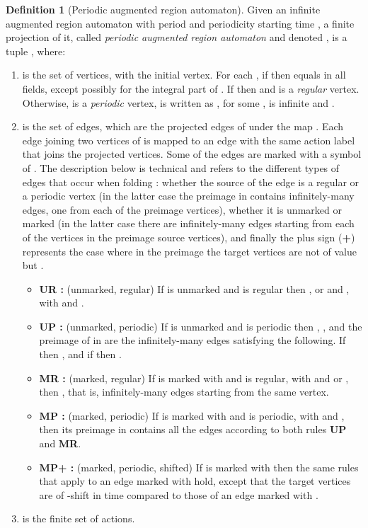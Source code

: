 \documentclass[11pt]{amsart}
\theoremstyle{definition}
\newtheorem{definition}[theorem]{Definition}
\begin{document}
\begin{definition}[Periodic augmented region automaton]
	\label{def:per_aug_region_automaton}
	Given an infinite augmented region automaton  with period  and periodicity starting time , a finite projection  of it, called \emph{periodic augmented region automaton} and denoted , is a tuple , where:
	\begin{enumerate}
		\item  is the set of vertices, with  the initial vertex.
		For each , if  then  equals  in all fields, except possibly for the integral part of .
If  then  and  is a \emph{regular} vertex.
		Otherwise,  is a \emph{periodic} vertex,  is written as , for some ,  is infinite and .
\item  is the set of edges, which are the projected edges of  under the map .
		Each edge joining two vertices of  is mapped to an edge with the same action label that joins the projected vertices. 
		Some of the edges are marked with a symbol of .
		The description below is technical and refers to the different types of edges that occur when folding : whether the source of the edge is a regular  or a periodic  vertex (in the latter case the preimage in  contains infinitely-many edges, one from each of the preimage vertices), whether it is unmarked  or marked  (in the latter case there are infinitely-many edges starting from each of the vertices in the preimage source vertices), and finally the plus sign (\textbf{+}) represents the case where in the preimage the target vertices are not of value  but .
\begin{itemize}
			\item \textnormal{\textbf{UR :}} (unmarked, regular) If  is unmarked and  is regular then ,  or    and , with  and .
\item \textnormal{\textbf{UP :}} (unmarked, periodic) If  is unmarked and  is periodic then , ,  and the preimage of  in  are the infinitely-many edges satisfying the following.
If  then , 
and if  then .
\item \textnormal{\textbf{MR :}} (marked, regular) If  is marked with  and  is regular, with  and  or   , then , that is, infinitely-many edges starting from the same vertex.
			\item \textnormal{\textbf{MP :}} (marked, periodic) If  is marked with  and  is periodic, with  and , then its preimage in  contains all the edges according to both rules \textnormal{\textbf{UP}} and \textnormal{\textbf{MR}}. 
		\item \textnormal{\textbf{MP+ :}} (marked, periodic, shifted) If  is marked with 
		then the same rules that apply to an edge marked with  hold, except that the target vertices are of -shift in time compared to those of an edge marked with . 
		\end{itemize}
		\item  is the finite set of actions.
\end{enumerate}
\end{definition}
\end{document}
